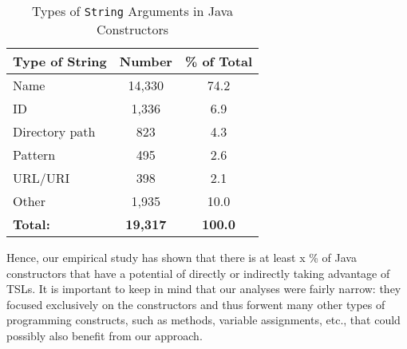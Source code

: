 \begin{table}
   \centering
    \begin{tabular}{l | c | c}
    \bf Type of String & \bf Number & \bf \% of Total \\ \hline
    Name & 14,330 & 74.2 \\
    ID	& 1,336 & 6.9 \\
    Directory path& 823 & 4.3 \\
    Pattern & 495 & 2.6 \\
    URL/URI & 398 & 2.1 \\
    Other & 1,935 & 10.0 \\ \hline
    \bf Total: & \bf 19,317 & \bf 100.0
    \end{tabular}
    \vspace{0.15in}
    \caption{Types of \lstinline{String} Arguments in Java Constructors}
    \label{t-strs-in-constrs}
\end{table}

Hence, our empirical study has shown that there is at least x \% of Java constructors that have a potential of directly or indirectly taking advantage of TSLs. It is important to keep in mind that our analyses were fairly narrow: they focused exclusively on the constructors and thus forwent many other types of programming constructs, such as methods, variable assignments, etc., that could possibly also benefit from our approach.

